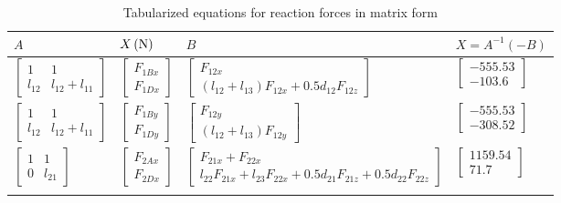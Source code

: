 \begin{table}
	\centering
	\caption{Tabularized equations for reaction forces in matrix form}
		\begin{tabular}{llll}\toprule
		$ A $  & $ X \, (\mathrm{N}) $  & $ B $ & $X=A^{-1}(-B) $  \\\midrule\addlinespace[1.5ex]
		$ \begin{bmatrix} 1 & 1\\ l_{12} & l_{12}+l_{11} \end{bmatrix}  $  & 
		$ \begin{bmatrix} F_{1Bx}\\ F_{1Dx} \end{bmatrix} $ & 
		$ \begin{bmatrix} F_{12x}\\ (l_{12}+l_{13})F_{12x}+0.5d_{12}F_{12z} \end{bmatrix} $ &
		$ \begin{bmatrix} -555.53\\ -103.6 \end{bmatrix} $\\\addlinespace[1.5ex]
		$ \begin{bmatrix} 1 & 1\\ l_{12} & l_{12}+l_{11} \end{bmatrix}  $  & 
		$ \begin{bmatrix} F_{1By}\\ F_{1Dy} \end{bmatrix} $ & 
		$ \begin{bmatrix} F_{12y}\\ (l_{12}+l_{13})F_{12y} \end{bmatrix} $ &
		$ \begin{bmatrix} -555.53\\ -308.52 \end{bmatrix} $\\\addlinespace[1.5ex]
		$ \begin{bmatrix} 1 & 1\\ 0 & l_{21} \end{bmatrix}  $  & 
		$ \begin{bmatrix} F_{2Ax}\\ F_{2Dx} \end{bmatrix} $ & 
		$ \begin{bmatrix} F_{21x}+F_{22x}\\ l_{22}F_{21x}+l_{23}F_{22x}+0.5d_{21}F_{21z}+0.5d_{22}F_{22z} \end{bmatrix} $ &
		$ \begin{bmatrix} 1159.54\\ 71.7 \end{bmatrix} $\\\addlinespace[1.5ex]

\end{tabular}
\end{table}
